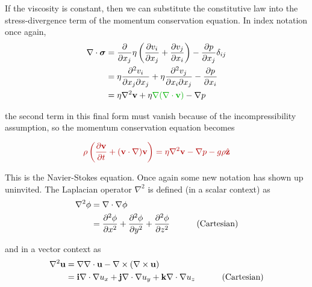 \documentclass[10pt]{article}
\begin{document}
	If the viscosity is constant, then we can substitute the constitutive law 
	into the stress-divergence term of the momentum conservation equation.
	In index notation once again,
		\begin{equation}
			\begin{split}
				\nabla \cdot \boldsymbol{\sigma} & =
					\frac{\partial}{\partial x_j} \eta 
						\left( \frac{\partial v_i}{\partial x_j} +	\frac{\partial v_j}{\partial x_i} \right)
						- \frac{\partial p}{\partial x_j} \delta_{ij} \\
				& = \eta \frac{\partial^2 v_i}{\partial x_j \partial x_j} +
							\eta \frac{\partial^2 v_j}{\partial x_i \partial x_j} -
								\frac{\partial p}{\partial x_i}\\
				& = \eta \nabla^2 \mathbf{v} +
				             \eta \Green{\nabla (\nabla \cdot \mathbf{v})} - \nabla p 		
			\end{split}		
		\end{equation}
	
	the second term in this final form must vanish because of 
	the incompressibility assumption, so the momentum conservation equation becomes
		
			\begin{equation}
				\Red{	\rho \left( \frac{\partial \mathbf{v}}{\partial t}
							+ (\mathbf{v} \cdot \nabla) \mathbf{v} \right) =
						 	\eta \nabla^2 \mathbf{v} - \nabla p	
						 	- g\rho\hat{\mathbf{z}}      }
				\label{eq:navstokes}		 	
			\end{equation}
	
	This is the Navier-Stokes equation.
	Once again some new notation has shown up uninvited. The Laplacian
	operator $\nabla^2$ is defined (in a scalar context) as
		\begin{equation}
			\begin{split}
			\nabla^2 \phi & = \nabla \cdot \nabla \phi \\
									& =	\frac{\partial^2 \phi}{\partial x^2} + 
											\frac{\partial^2 \phi}{\partial y^2} + 	
											\frac{\partial^2 \phi}{\partial z^2}  \text{\hspace{1cm} (Cartesian)}
			\end{split}
		\end{equation}
	
	and in a vector context as
		\begin{equation}
			\begin{split}
				\nabla^2 \mathbf{u} & = \nabla \nabla \cdot \mathbf{u} - \nabla \times (\nabla \times \mathbf{u}) \\
													& =	\mathbf{i} \nabla \cdot \nabla u_x + 
															\mathbf{j} \nabla \cdot \nabla u_y + 
															\mathbf{k} \nabla \cdot \nabla u_z   \text{\hspace{1cm} (Cartesian)}
			\end{split}
		\end{equation}
	
\end{document}
